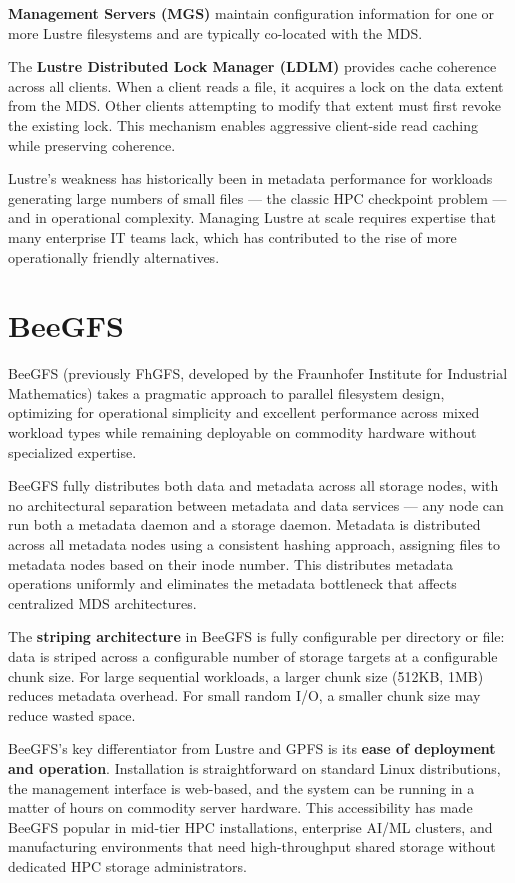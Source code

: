 \textbf{Management Servers (MGS)} maintain configuration information for one or more Lustre filesystems and are typically co-located with the MDS.

The \textbf{Lustre Distributed Lock Manager (LDLM)} provides cache coherence across all clients. When a client reads a file, it acquires a lock on the data extent from the MDS. Other clients attempting to modify that extent must first revoke the existing lock. This mechanism enables aggressive client-side read caching while preserving coherence.

Lustre's weakness has historically been in metadata performance for workloads generating large numbers of small files --- the classic HPC checkpoint problem --- and in operational complexity. Managing Lustre at scale requires expertise that many enterprise IT teams lack, which has contributed to the rise of more operationally friendly alternatives.

\section{BeeGFS}
BeeGFS (previously FhGFS, developed by the Fraunhofer Institute for Industrial Mathematics) takes a pragmatic approach to parallel filesystem design, optimizing for operational simplicity and excellent performance across mixed workload types while remaining deployable on commodity hardware without specialized expertise.

BeeGFS fully distributes both data and metadata across all storage nodes, with no architectural separation between metadata and data services --- any node can run both a metadata daemon and a storage daemon. Metadata is distributed across all metadata nodes using a consistent hashing approach, assigning files to metadata nodes based on their inode number. This distributes metadata operations uniformly and eliminates the metadata bottleneck that affects centralized MDS architectures.

The \textbf{striping architecture} in BeeGFS is fully configurable per directory or file: data is striped across a configurable number of storage targets at a configurable chunk size. For large sequential workloads, a larger chunk size (512KB, 1MB) reduces metadata overhead. For small random I/O, a smaller chunk size may reduce wasted space.

BeeGFS's key differentiator from Lustre and GPFS is its \textbf{ease of deployment and operation}. Installation is straightforward on standard Linux distributions, the management interface is web-based, and the system can be running in a matter of hours on commodity server hardware. This accessibility has made BeeGFS popular in mid-tier HPC installations, enterprise AI/ML clusters, and manufacturing environments that need high-throughput shared storage without dedicated HPC storage administrators.

